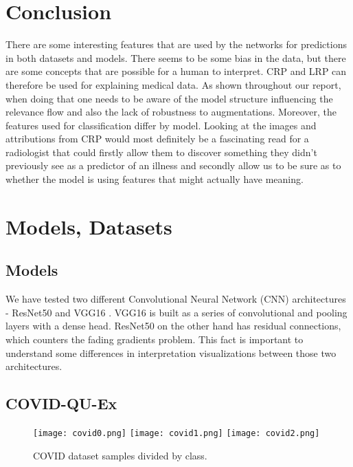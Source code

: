 \documentclass[twoside,11pt]{article}
\begin{document}
\section{Conclusion}
There are some interesting features that are used by the networks for predictions in both datasets and models. There seems to be some bias in the data, but there are some concepts that are possible for a human to interpret. CRP and LRP can therefore be used for explaining medical data. As shown throughout our report, when doing that one needs to be aware of the model structure influencing the relevance flow and also the lack of robustness to augmentations. Moreover, the features used for classification differ by model. Looking at the images and attributions from CRP would most definitely be a fascinating read for a radiologist that could firstly allow them to discover something they didn't previously see as a predictor of an illness and secondly allow us to be sure as to whether the model is using features that might actually have meaning.


\clearpage



\clearpage
\appendix
\section{Models, Datasets} \label{appendix:datasets}
\subsection{Models}
We have tested two different Convolutional Neural Network (CNN) architectures - ResNet50 \citep{DBLP:journals/corr/HeZRS15} and VGG16 \citep{https://doi.org/10.48550/arxiv.1409.1556}. VGG16 is built as a series of convolutional and pooling layers with a dense head. ResNet50 on the other hand has residual connections, which counters the fading gradients problem. This fact is important to understand some differences in interpretation visualizations between those two architectures.

\subsection{COVID-QU-Ex}
\begin{figure}[t]
    \centering
    \texttt{[image: covid0.png]}
    \texttt{[image: covid1.png]}
    \texttt{[image: covid2.png]}
    \caption{COVID dataset samples divided by class.}
    \label{fig:covid_dataset}
\end{figure}
\end{document}
